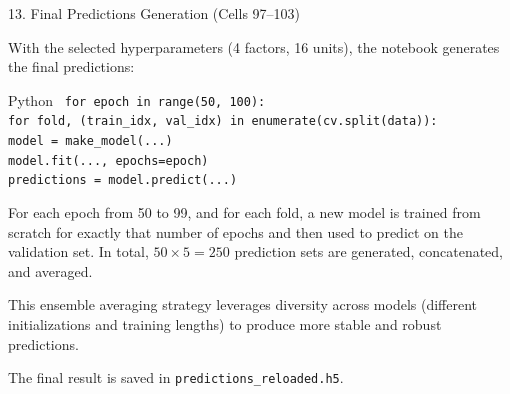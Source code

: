 \documentclass[aspectratio=169, 11pt]{beamer}
\begin{document}
%
%
\begin{frame}{13. Final Predictions Generation (Cells 97--103)}

With the selected hyperparameters (4 factors, 16 units), the notebook generates the final predictions:

\vspace{0.3cm}

\begin{block}{Python}
\small
\texttt{
for epoch in range(50, 100): \\
\hspace{0.8cm} for fold, (train\_idx, val\_idx) in enumerate(cv.split(data)): \\
\hspace{1.6cm} model = make\_model(...) \\
\hspace{1.6cm} model.fit(..., epochs=epoch) \\
\hspace{1.6cm} predictions = model.predict(...)
}
\end{block}

\vspace{0.3cm}

For each epoch from 50 to 99, and for each fold, a new model is trained from scratch for exactly that number of epochs and then used to predict on the validation set. In total, $50 \times 5 = 250$ prediction sets are generated, concatenated, and averaged.

\vspace{0.3cm}

This ensemble averaging strategy leverages diversity across models (different initializations and training lengths) to produce more stable and robust predictions.

\vspace{0.3cm}

The final result is saved in \texttt{predictions\_reloaded.h5}.

\end{frame}
%
%
\end{document}
